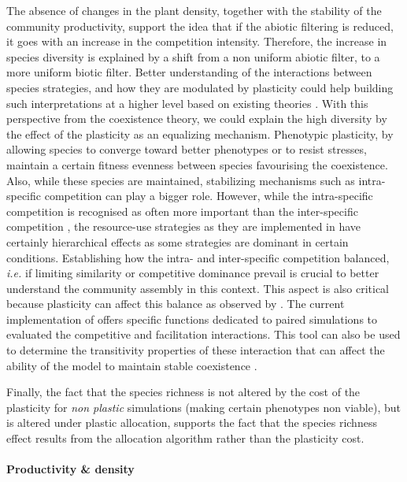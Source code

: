 The absence of changes in the plant density, together with the stability of the community productivity, support the idea that if the abiotic filtering is reduced, it goes with an increase in the competition intensity. Therefore, the increase in species diversity is explained by a shift from a non uniform abiotic filter, to a more uniform biotic filter. Better understanding of the interactions between species strategies, and how they are modulated by plasticity could help building such interpretations at a higher level based on existing theories \parencite{chesson_mechanisms_2000}. 
With this perspective from the coexistence theory, we could explain the high diversity by the effect of the plasticity as an equalizing mechanism. Phenotypic plasticity, by allowing species to converge toward better phenotypes or to resist stresses, maintain a certain fitness evenness between species favourising the coexistence. Also, while these species are maintained, stabilizing mechanisms such as intra-specific competition can play a bigger role. However, while the intra-specific competition is recognised as often more important than the inter-specific competition \parencite{macarthur_limiting_1967}, the resource-use strategies as they are implemented in \model have certainly hierarchical effects \parencite{kunstler_plant_2016} as some strategies are dominant in certain conditions. Establishing how the intra- and inter-specific competition balanced, \textit{i.e.} if limiting similarity or competitive dominance prevail is crucial to better understand the community assembly in this context. This aspect is also critical because plasticity can affect this balance as observed by \cite{bennett_reciprocal_2016}. The current implementation of \model offers specific functions dedicated to paired simulations to evaluated the competitive and facilitation interactions. This tool can also be used to determine the transitivity properties of these interaction that can affect the ability of the model to maintain stable coexistence \parencite{levine_beyond_2017}. 


Finally, the fact that the species richness is not altered by the cost of the plasticity for \textit{non plastic} simulations (making certain phenotypes non viable), but is altered under plastic allocation, supports the fact that the species richness effect results from the allocation algorithm rather than the plasticity cost.


\paragraph{Productivity \& density}

